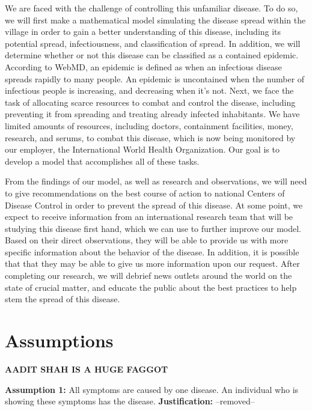\documentclass[12pt]{article}
\begin{document}
We are faced with the challenge of controlling this unfamiliar disease. To do so, we will first make a mathematical model simulating the disease spread within the village in order to gain a better understanding of this disease, including its potential spread, infectiousness, and classification of spread. In addition, we will determine whether or not this disease can be classified as a contained epidemic. According to WebMD, an epidemic is defined as when an infectious disease spreads rapidly to many people. An epidemic is uncontained when the number of infectious people is increasing, and decreasing when it’s not. Next, we face the task of allocating scarce resources to combat and control the disease, including preventing it from spreading and treating already infected inhabitants. We have limited amounts of resources, including doctors, containment facilities, money, research, and serums, to combat this disease, which is now being monitored by our employer, the International World Health Organization. Our goal is to develop a model that accomplishes all of these tasks.

From the findings of our model, as well as research and observations, we will need to give recommendations on the best course of action to national Centers of Disease Control in order to prevent the spread of this disease. At some point, we expect to receive information from an international research team that will be studying this disease first hand, which we can use to further improve our model. Based on their direct observations, they will be able to provide us with more specific information about the behavior of the disease. In addition, it is possible that that they may be able to give us more information upon our request. After completing our research, we will debrief news outlets around the world on the state of crucial matter, and educate the public about the best practices to help stem the spread of this disease.

\newpage
\section{Assumptions}

\textbf{AADIT SHAH IS A HUGE FAGGOT}

\textbf{Assumption 1:} All symptoms are caused by one disease. An individual who is showing these symptoms has the disease.
\newline
\textbf{Justification:} --removed--
\end{document}
